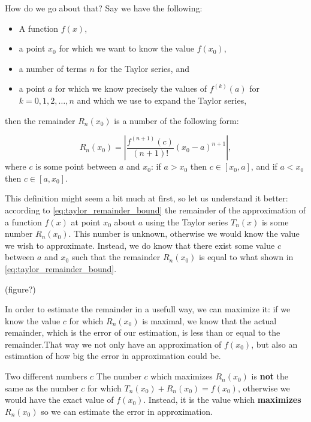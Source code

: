 How do we go about that? Say we have the following:
\begin{itemize}
  \item A function $f(x)$,
  \item a point $x_{0}$ for which we want to know the value $f\left(x_{0}\right)$,
  \item a number of terms $n$ for the Taylor series, and
  \item a point $a$ for which we know precisely the values of $f^{(k)}(a)$ for $k=0,1,2,\dots,n$ and which we use to expand the Taylor series,
\end{itemize}
then the remainder $R_{n}\left(x_{0}\right)$ is a number of the following form:

\begin{equation}
  R_{n}\left(x_{0}\right) = \left| \frac{f^{\left(n+1\right)}(c)}{(n+1)!}\left(x_{0}-a\right)^{n+1} \right|,
  \label{eq:taylor_remainder_bound}
\end{equation}
where $c$ is some point between $a$ and $x_{0}$: if $a>x_{0}$ then $c\in\left[x_{0},a\right]$, and if $a<x_{0}$ then $c\in\left[a,x_{0}\right]$.

This definition might seem a bit much at first, so let us understand it better: according to \autoref{eq:taylor_remainder_bound} the remainder of the approximation of a function $f(x)$ at point $x_{0}$ about $a$ using the Taylor series $T_{n}(x)$ is some number $R_{n}\left(x_{0}\right)$. This number is unknown, otherwise we would know the value we wish to approximate. Instead, we do know that there exist some value $c$ between $a$ and $x_{0}$ such that the remainder $R_{n}\left(x_{0}\right)$ is equal to what shown in \autoref{eq:taylor_remainder_bound}.

(figure?)

In order to estimate the remainder in a usefull way, we can maximize it: if we know the value $c$ for which $R_{n}\left(x_{0}\right)$ is maximal, we know that the actual remainder, which is the error of our estimation, is less than or equal to the remainder.That way we not only have an approximation of $f\left(x_{0}\right)$, but also an estimation of how big the error in approximation could be.

\begin{note}{Two different numbers $c$}{}
  The number $c$ which maximizes $R_{n}\left(x_{0}\right)$ is \textbf{not} the same as the number $c$ for which $T_{n}\left(x_{0}\right) + R_{n}\left(x_{0}\right) = f\left(x_{0}\right)$, otherwise we would have the exact value of $f\left(x_{0}\right)$. Instead, it is the value which \textbf{maximizes} $R_{n}\left(x_{0}\right)$ so we can estimate the error in approximation.
\end{note}

